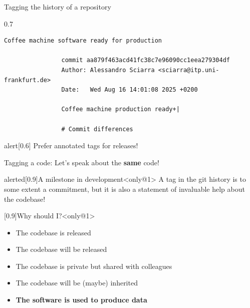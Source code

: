 \begin{frame}[fragile]{Tagging the history of a repository}
\begin{overlayarea}{\textwidth}{0.7\textheight}
\begin{onlyenv}
\begin{lstlisting}[style=MyBash, aboveskip=7mm]
                Coffee machine software ready for production

                commit aa879f463acd41fc38c7e96090cc1eea279304df
                Author: Alessandro Sciarra <sciarra@itp.uni-frankfurt.de>
                Date:   Wed Aug 16 14:01:08 2025 +0200

                Coffee machine production ready+|

                # Commit differences
            \end{lstlisting}
            \begin{varblock}{alert}[0.6\textwidth]{}
                \alert{Prefer annotated tags for releases!}
            \end{varblock}
        \end{onlyenv}
    \end{overlayarea}
\end{frame}
\begin{frame}[fragile]{Tagging a code: Let's speak about the \textbf{same} code!}
    \vspace{-3mm}
    \begin{varblock}{alerted}[0.9\textwidth]{A milestone in development}<only@1>
        A tag in the git history is to some extent a commitment, but it is also a statement of invaluable help about the codebase!
    \end{varblock}
    \begin{varblock}{}[0.9\textwidth]{Why should I?}<only@1>
        \begin{itemize}
            \item The codebase is released
            \item The codebase will be released
            \item The codebase is  private but shared with colleagues
            \item The codebase will be (maybe) inherited
            \item \textbf{The software is used to produce data}
        \end{itemize}
    \end{varblock}
\end{frame}


